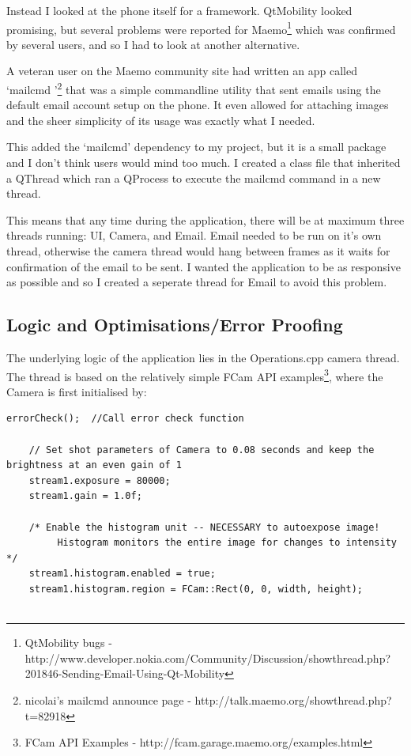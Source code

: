 \documentclass[11pt]{article} %
\begin{document}
{{Instead I looked at the phone itself for a framework.  QtMobility looked promising, but several problems were reported for Maemo\footnote{QtMobility bugs - http://www.developer.nokia.com/Community/Discussion/showthread.php?201846-Sending-Email-Using-Qt-Mobility} which was confirmed by several users, and so I had to look at another alternative.

A veteran user on the Maemo community site had written an app called ‘mailcmd ’\footnote{nicolai’s mailcmd announce page - http://talk.maemo.org/showthread.php?t=82918} that was a simple commandline utility that sent emails using the default email account setup on the phone. It even allowed for attaching images and the sheer simplicity of its usage was exactly what I needed.

This added the ‘mailcmd’ dependency to my project, but it is a small package and I don’t think users would mind too much. I created a class file that inherited a QThread which ran a QProcess to execute the mailcmd command in a new thread.

This means that any time during the application, there will be at maximum three threads running: UI, Camera, and Email. Email needed to be run on it’s own thread, otherwise the camera thread would hang between frames as it waits for confirmation of the email to be sent. I wanted the application to be as responsive as possible and so I created a seperate thread for Email to avoid this problem.

\subsection{Logic and Optimisations/Error Proofing}
The underlying logic of the application lies in the Operations.cpp camera thread. The thread is based on the relatively simple FCam API examples\footnote{FCam API Examples - http://fcam.garage.maemo.org/examples.html}, where the Camera is first initialised by:
\begin{lstlisting}[title=\bf Snippet initialise() function in Operations.cpp]
     errorCheck();  //Call error check function

    // Set shot parameters of Camera to 0.08 seconds and keep the brightness at an even gain of 1
    stream1.exposure = 80000;
    stream1.gain = 1.0f;

    /* Enable the histogram unit -- NECESSARY to autoexpose image!
         Histogram monitors the entire image for changes to intensity */
    stream1.histogram.enabled = true;
    stream1.histogram.region = FCam::Rect(0, 0, width, height); 


\end{lstlisting}}}
\end{document}
